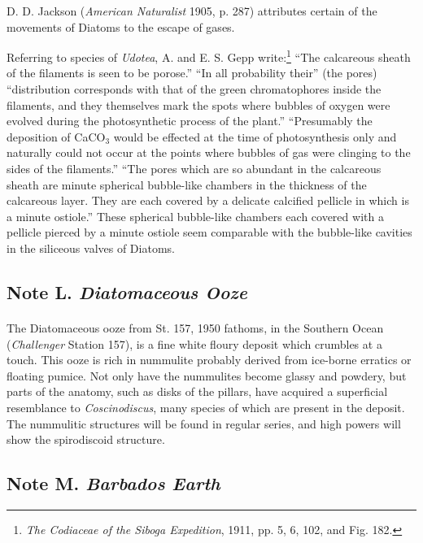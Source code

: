 \documentclass[a4paper, 12pt, oneside, landscape]{article}
\begin{document}
D. D. Jackson (\emph{American Naturalist} 1905, p. 287) attributes certain of the movements of Diatoms to the escape of gases.

Referring to species of \emph{Udotea}, A. and E. S. Gepp write:\footnote{\emph{The Codiaceae of the \emph{Siboga} Expedition}, 1911, pp. 5, 6, 102, and Fig. 182.} ``The calcareous sheath of the filaments is seen to be porose.'' ``In all probability their'' (the pores) ``distribution corresponds with that of the green chromatophores inside the filaments, and they themselves mark the spots where bubbles of oxygen were evolved during the photosynthetic process of the plant.'' ``Presumably the deposition of CaCO$_{3}$ would be effected at the time of photosynthesis only and naturally could not occur at the points where bubbles of gas were clinging to the sides of the filaments.'' ``The pores which are so abundant in the calcareous sheath are minute spherical bubble-like chambers in the thickness of the calcareous layer. They are each covered by a delicate calcified pellicle in which is a minute ostiole.'' These spherical bubble-like chambers each covered with a pellicle pierced by a minute ostiole seem comparable with the bubble-like cavities in the siliceous valves of Diatoms.

\subsection{Note L. \emph{Diatomaceous Ooze}}
\paragraph{}
The Diatomaceous ooze from St. 157, 1950 fathoms, in the Southern Ocean (\emph{Challenger} Station 157), is a fine white floury deposit which crumbles at a touch. This ooze is rich in nummulite probably derived from ice-borne erratics or floating pumice. Not only have the nummulites become glassy and powdery, but parts of the anatomy, such as disks of the pillars, have acquired a superficial resemblance to \emph{Coscinodiscus}, many species of which are present in the deposit. The nummulitic structures will be found in regular series, and high powers will show the spirodiscoid structure.

\subsection{Note M. \emph{Barbados Earth}}
\end{document}
